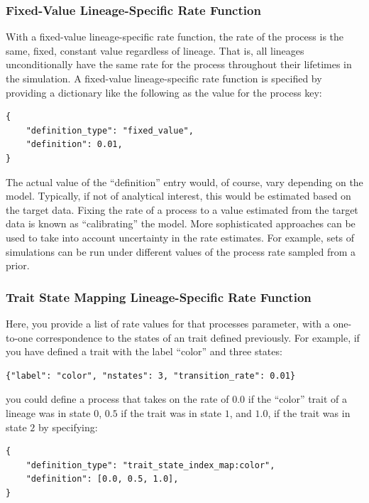 \documentclass[11pt,openany]{memoir} %
\begin{document}
\subsubsection{Fixed-Value Lineage-Specific Rate Function}
With a fixed-value lineage-specific rate function, the rate of the process is the same, fixed, constant value regardless of lineage.
That is, all lineages unconditionally have the same rate for the process throughout their lifetimes in the simulation.
A fixed-value lineage-specific rate function is specified by providing a dictionary like the following as the value for the process key:
\begin{lstlisting}
{
    "definition_type": "fixed_value",
    "definition": 0.01,
}
\end{lstlisting}
The actual value of the ``definition'' entry would, of course, vary depending on the model.
Typically, if not of analytical interest, this would be estimated based on the target data.
Fixing the rate of a process to a value estimated from the target data is known as ``calibrating'' the model.
More sophisticated approaches can be used to take into account uncertainty in the rate estimates.
For example, sets of simulations can be run under different values of the process rate sampled from a prior.

\subsubsection{Trait State Mapping Lineage-Specific Rate Function}
Here, you provide a list of rate values for that processes parameter, with a one-to-one correspondence to the states of an trait defined previously.
For example, if you have defined a trait with the label ``color'' and three states:
\begin{lstlisting}
{"label": "color", "nstates": 3, "transition_rate": 0.01}
\end{lstlisting}
you could define a process that takes on the rate of $0.0$ if the ``color'' trait of a lineage was in state $0$, $0.5$ if the trait was in state $1$, and $1.0$, if the trait was in state $2$ by specifying:
\begin{lstlisting}
{
    "definition_type": "trait_state_index_map:color",
    "definition": [0.0, 0.5, 1.0],
}
\end{lstlisting}
\end{document}
